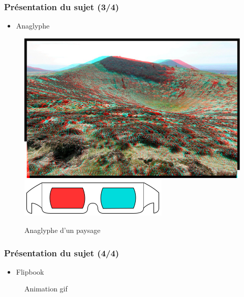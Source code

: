 \documentclass{beamer}
\begin{document}
\begin{frame}

\frametitle{Présentation du sujet (3/4)}

\begin{itemize}[label=$\bullet$]
\item Anaglyphe
\end{itemize}
\begin{figure}
\centering
\includegraphics[scale=0.4]{anaglyphe-cratere-puy.jpg} %
\includegraphics[scale=0.2]{lunettes.png}
\caption{Anaglyphe d'un paysage \footnotemark}
\end{figure}

\end{frame}



\begin{frame}

\frametitle{Présentation du sujet (4/4)}

\begin{itemize}[label=$\bullet$]
\item Flipbook
\end{itemize}
\begin{figure}
\centering
{}
\caption{Animation gif\footnotemark}
\end{figure}
\end{frame}
\end{document}
